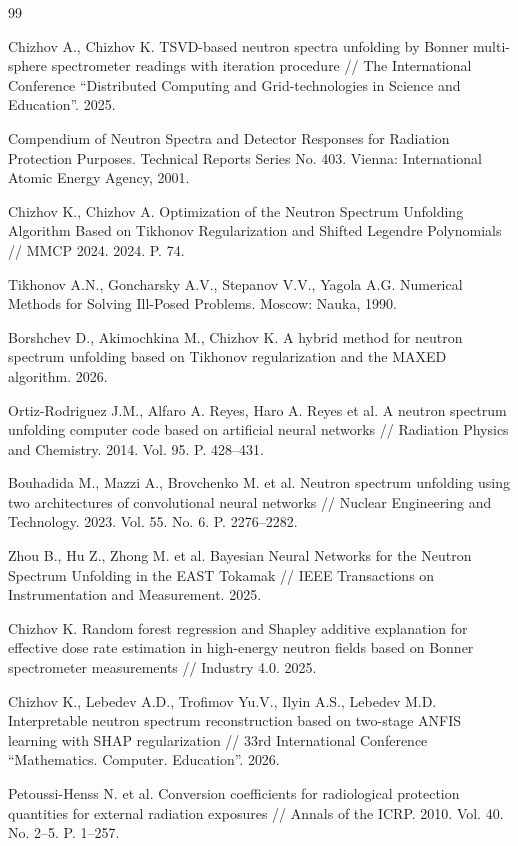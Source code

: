 \begin{thebibliography}{99}

Chizhov A., Chizhov K. TSVD-based neutron spectra unfolding by Bonner multi-sphere spectrometer readings with iteration procedure // The International Conference ``Distributed Computing and Grid-technologies in Science and Education''. 2025.

Compendium of Neutron Spectra and Detector Responses for Radiation Protection Purposes. Technical Reports Series No. 403. Vienna: International Atomic Energy Agency, 2001.

Chizhov K., Chizhov A. Optimization of the Neutron Spectrum Unfolding Algorithm Based on Tikhonov Regularization and Shifted Legendre Polynomials // MMCP 2024. 2024. P. 74.

Tikhonov A.N., Goncharsky A.V., Stepanov V.V., Yagola A.G. Numerical Methods for Solving Ill-Posed Problems. Moscow: Nauka, 1990.

Borshchev D., Akimochkina M., Chizhov K. A hybrid method for neutron spectrum unfolding based on Tikhonov regularization and the MAXED algorithm. 2026.

Ortiz-Rodriguez J.M., Alfaro A. Reyes, Haro A. Reyes et al. A neutron spectrum unfolding computer code based on artificial neural networks // Radiation Physics and Chemistry. 2014. Vol. 95. P. 428--431.

Bouhadida M., Mazzi A., Brovchenko M. et al. Neutron spectrum unfolding using two architectures of convolutional neural networks // Nuclear Engineering and Technology. 2023. Vol. 55. No. 6. P. 2276--2282.

Zhou B., Hu Z., Zhong M. et al. Bayesian Neural Networks for the Neutron Spectrum Unfolding in the EAST Tokamak // IEEE Transactions on Instrumentation and Measurement. 2025.

Chizhov K. Random forest regression and Shapley additive explanation for effective dose rate estimation in high-energy neutron fields based on Bonner spectrometer measurements // Industry 4.0. 2025.

Chizhov K., Lebedev A.D., Trofimov Yu.V., Ilyin A.S., Lebedev M.D. Interpretable neutron spectrum reconstruction based on two-stage ANFIS learning with SHAP regularization // 33rd International Conference ``Mathematics. Computer. Education''. 2026.

Petoussi-Henss N. et al. Conversion coefficients for radiological protection quantities for external radiation exposures // Annals of the ICRP. 2010. Vol. 40. No. 2--5. P. 1--257.

\end{thebibliography}
